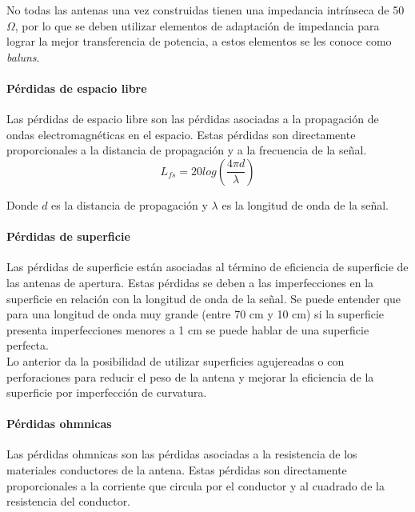 No todas las antenas una vez construidas tienen una impedancia intrínseca de 50$\Omega$, por lo que se deben utilizar elementos de adaptación de impedancia para lograr la mejor transferencia de potencia, a estos elementos se les conoce como \textit{baluns}.\\

\paragraph{Pérdidas de espacio libre}

Las pérdidas de espacio libre son las pérdidas asociadas a la propagación de ondas electromagnéticas en el espacio. Estas pérdidas son directamente proporcionales a la distancia de propagación y a la frecuencia de la señal.\\

\begin{equation}
    L_{fs} = 20log\left(\frac{4\pi d}{\lambda}\right)
\end{equation}

Donde $d$ es la distancia de propagación y $\lambda$ es la longitud de onda de la señal.\\

\paragraph{Pérdidas de superficie}

Las pérdidas de superficie están asociadas al término de eficiencia de superficie de las antenas de apertura. Estas pérdidas se deben a las imperfecciones en la superficie en relación con la longitud de onda de la señal. Se puede entender que para una longitud de onda muy grande (entre 70 cm y 10 cm) si la superficie presenta imperfecciones menores a 1 cm se puede hablar de una superficie perfecta.\\

Lo anterior da la posibilidad de utilizar superficies agujereadas o con perforaciones para reducir el peso de la antena y mejorar la eficiencia de la superficie por imperfección de curvatura.\\

\paragraph{Pérdidas ohmnicas}

Las pérdidas ohmnicas son las pérdidas asociadas a la resistencia de los materiales conductores de la antena. Estas pérdidas son directamente proporcionales a la corriente que circula por el conductor y al cuadrado de la resistencia del conductor.\\

